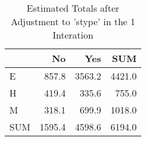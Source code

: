 \begin{table}[ht]
\centering
\caption{Estimated Totals after Adjustment to 'stype' in the 1 Interation} 
\begin{tabular}{l|rr|r}
  & No & Yes & SUM \\ 
  \hline
E & 857.8 & 3563.2 & 4421.0 \\ 
  H & 419.4 & 335.6 & 755.0 \\ 
  M & 318.1 & 699.9 & 1018.0 \\ 
   \hline
SUM & 1595.4 & 4598.6 & 6194.0 \\ 
  \end{tabular}
\end{table}
